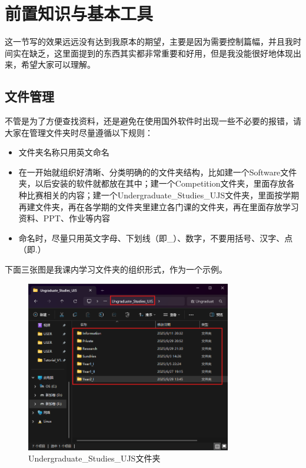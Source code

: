 \documentclass[a4paper,12pt]{article}
\begin{document}
\section{前置知识与基本工具}

这一节写的效果远远没有达到我原本的期望，主要是因为需要控制篇幅，并且我时间实在缺乏，这里面提到的东西其实都非常重要和好用，但是我没能很好地体现出来，希望大家可以理解。

\subsection{文件管理}

不管是为了方便查找资料，还是避免在使用国外软件时出现一些不必要的报错，请大家在管理文件夹时尽量遵循以下规则：

\begin{itemize}
    \item 文件夹名称只用英文命名
    \item 在一开始就组织好清晰、分类明确的的文件夹结构，比如建一个Software文件夹，以后安装的软件就都放在其中；建一个Competition文件夹，里面存放各种比赛相关的内容；建一个Undergraduate\_Studies\_UJS文件夹，里面按学期再建文件夹，再在各学期的文件夹里建立各门课的文件夹，再在里面存放学习资料、PPT、作业等内容
    \item 命名时，尽量只用英文字母、下划线（即\_）、数字，不要用括号、汉字、点（即.）
\end{itemize}

下面三张图是我课内学习文件夹的组织形式，作为一个示例。

\begin{figure}[h]
\centering
\includegraphics[width=0.8\textwidth]{images/image-20251001123622474.png}
\caption{Undergraduate\_Studies\_UJS文件夹}
\end{figure}
\end{document}
